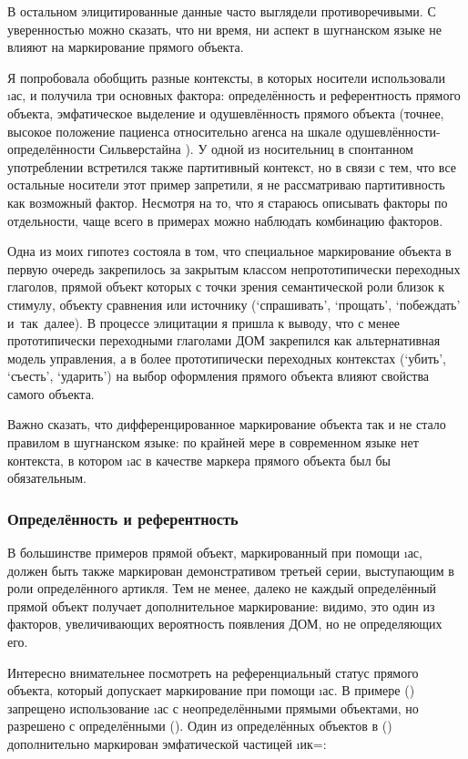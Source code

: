 В остальном элицитированные данные часто выглядели противоречивыми. С уверенностью можно сказать, что ни время, ни аспект в шугнанском языке не влияют на маркирование прямого объекта.

Я попробовала обобщить разные контексты, в которых носители использовали \i{ас}, и получила три основных фактора: определённость и референтность прямого объекта, эмфатическое выделение и одушевлённость прямого объекта (точнее, высокое положение пациенса относительно агенса на шкале одушевлённости-определённости Сильверстайна \parencite[176]{silverstein1976}). У одной из носительниц в спонтанном употреблении встретился также партитивный контекст, но в связи с тем, что все остальные носители этот пример запретили, я не рассматриваю партитивность как возможный фактор. Несмотря на то, что я стараюсь описывать факторы по отдельности, чаще всего в примерах можно наблюдать комбинацию факторов.

Одна из моих гипотез состояла в том, что специальное маркирование объекта в первую очередь закрепилось за закрытым классом непрототипически переходных глаголов, прямой объект которых с точки зрения семантической роли близок к стимулу, объекту сравнения или источнику (‘спрашивать’, ‘прощать’, ‘побеждать’ и~так~далее). В процессе элицитации я пришла к выводу, что с менее прототипически переходными глаголами ДОМ закрепился как альтернативная модель управления, а в более прототипически переходных контекстах (‘убить’, ‘съесть’, ‘ударить’) на выбор оформления прямого объекта влияют свойства самого объекта.

Важно сказать, что дифференцированное маркирование объекта так и не стало правилом в шугнанском языке: по крайней мере в современном языке нет контекста, в котором \i{ас} в качестве маркера прямого объекта был бы обязательным.

\subsubsection{Определённость и референтность} \label{dom-definite}

В большинстве примеров прямой объект, маркированный при помощи \i{ас}, должен быть также маркирован демонстративом третьей серии, выступающим в роли определённого артикля. Тем не менее, далеко не каждый определённый прямой объект получает дополнительное маркирование: видимо, это один из факторов, увеличивающих вероятность появления ДОМ, но не определяющих его.

Интересно внимательнее посмотреть на референциальный статус прямого объекта, который допускает маркирование при помощи \i{ас}. В примере () запрещено использование \i{ас} с неопределёнными прямыми объектами, но разрешено с определёнными (). Один из определённых объектов в () дополнительно маркирован эмфатической частицей \i{ик}=\fn{Можно обратить внимание, что \i{ик}= оформляет сразу всю конструкцию \i{ас wи аwқот} ‘этот ужин’, ср.~\i{ик=[wам дирахт бун=анд]} [{\sc emph=d3.f.sg.o} дерево низ={\sc loc}) ‘под этим деревом’ \parencite[280]{karamshoev1988}.}:

